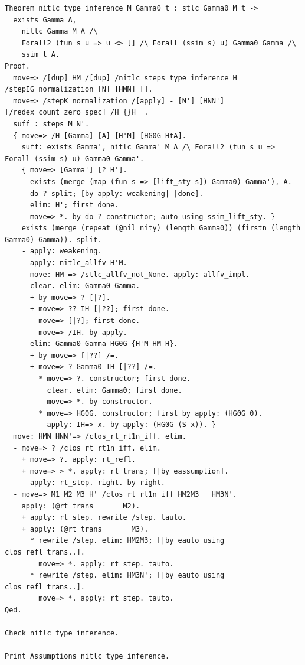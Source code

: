 \begin{lstlisting}[style=authorcoq]
Theorem nitlc_type_inference M Gamma0 t : stlc Gamma0 M t ->
  exists Gamma A,
    nitlc Gamma M A /\
    Forall2 (fun s u => u <> [] /\ Forall (ssim s) u) Gamma0 Gamma /\
    ssim t A.
Proof.
  move=> /[dup] HM /[dup] /nitlc_steps_type_inference H /stepIG_normalization [N] [HMN] [].
  move=> /stepK_normalization /[apply] - [N'] [HNN'] [/redex_count_zero_spec] /H {}H _.
  suff : steps M N'.
  { move=> /H [Gamma] [A] [H'M] [HG0G HtA].
    suff: exists Gamma', nitlc Gamma' M A /\ Forall2 (fun s u => Forall (ssim s) u) Gamma0 Gamma'.
    { move=> [Gamma'] [? H'].
      exists (merge (map (fun s => [lift_sty s]) Gamma0) Gamma'), A.
      do ? split; [by apply: weakening| |done].
      elim: H'; first done.
      move=> *. by do ? constructor; auto using ssim_lift_sty. }
    exists (merge (repeat (@nil nity) (length Gamma0)) (firstn (length Gamma0) Gamma)). split.
    - apply: weakening.
      apply: nitlc_allfv H'M.
      move: HM => /stlc_allfv_not_None. apply: allfv_impl.
      clear. elim: Gamma0 Gamma.
      + by move=> ? [|?].
      + move=> ?? IH [|??]; first done.
        move=> [|?]; first done.
        move=> /IH. by apply.
    - elim: Gamma0 Gamma HG0G {H'M HM H}.
      + by move=> [|??] /=.
      + move=> ? Gamma0 IH [|??] /=.
        * move=> ?. constructor; first done.
          clear. elim: Gamma0; first done.
          move=> *. by constructor.
        * move=> HG0G. constructor; first by apply: (HG0G 0).
          apply: IH=> x. by apply: (HG0G (S x)). }
  move: HMN HNN'=> /clos_rt_rt1n_iff. elim.
  - move=> ? /clos_rt_rt1n_iff. elim.
    + move=> ?. apply: rt_refl.
    + move=> > *. apply: rt_trans; [|by eassumption].
      apply: rt_step. right. by right.
  - move=> M1 M2 M3 H' /clos_rt_rt1n_iff HM2M3 _ HM3N'.
    apply: (@rt_trans _ _ _ M2).
    + apply: rt_step. rewrite /step. tauto.
    + apply: (@rt_trans _ _ _ M3).
      * rewrite /step. elim: HM2M3; [|by eauto using clos_refl_trans..].
        move=> *. apply: rt_step. tauto.
      * rewrite /step. elim: HM3N'; [|by eauto using clos_refl_trans..].
        move=> *. apply: rt_step. tauto.
Qed.

Check nitlc_type_inference.

Print Assumptions nitlc_type_inference.
\end{lstlisting}
